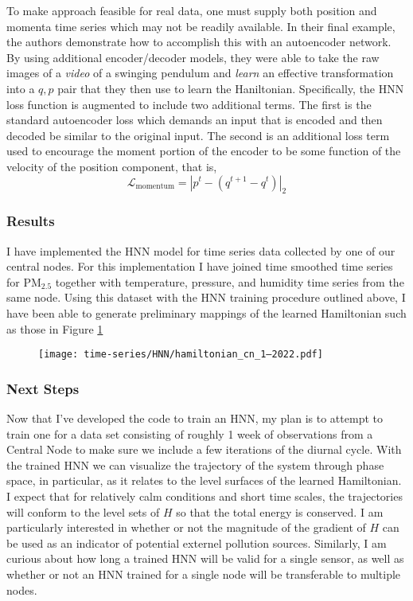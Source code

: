 To make approach feasible for real data, one must supply both position and momenta time series which may not be readily available. In their final example, the authors demonstrate how to accomplish this with an autoencoder network. By using additional encoder/decoder models, they were able to take the raw images of a \textit{video} of a swinging pendulum and \textit{learn} an effective transformation into a $q,p$ pair that they then use to learn the Haniltonian. Specifically, the HNN loss function is augmented to include two additional terms. The first is the standard autoencoder loss which demands an input that is encoded and then decoded be similar to the original input. The second is an additional loss term used to encourage the moment portion of the encoder to be some function of the velocity of the position component, that is,
\begin{equation}
  \mathcal{L}_{\text{momentum}} = \left\lvert p^t - (q^{t+1} - q^{t}) \right\rvert_2
\end{equation}



\subsubsection{Results}

I have implemented the HNN model for time series data collected by one of our central nodes. For this implementation I have joined time smoothed time series for $\text{PM}_{2.5}$ together with temperature, pressure, and humidity time series from the same node. Using this dataset with the HNN training procedure outlined above, I have been able to generate preliminary mappings of the learned Hamiltonian such as those in Figure \ref{fig:learned-hamiltonian}
\begin{figure}[h]
  \centering
  \texttt{[image: time-series/HNN/hamiltonian\_cn\_1--2022.pdf]}
  \label{fig:learned-hamiltonian}
\end{figure}

\subsubsection{Next Steps}

Now that I've developed the code to train an HNN, my plan is to attempt to train one for a data set consisting of roughly 1 week of observations from a Central Node to make sure we include a few iterations of the diurnal cycle. With the trained HNN we can visualize the trajectory of the system through phase space, in particular, as it relates to the level surfaces of the learned Hamiltonian. I expect that for relatively calm conditions and short time scales, the trajectories will conform to the level sets of $H$ so that the total energy is conserved. I am particularly interested in whether or not the magnitude of the gradient of $H$ can be used as an indicator of potential externel pollution sources. Similarly, I am curious about how long a trained HNN will be valid for a single sensor, as well as whether or not an HNN trained for a single node will be transferable to multiple nodes. 



